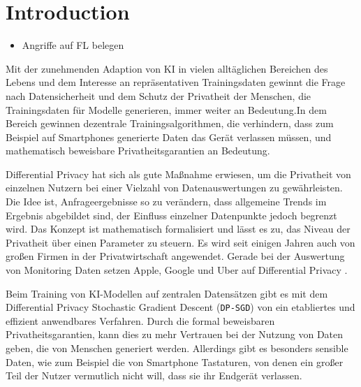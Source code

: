 \chapter{Introduction}
\begin{itemize}
	\item Angriffe auf FL belegen
\end{itemize}

Mit der zunehmenden Adaption von KI in vielen alltäglichen Bereichen des Lebens und dem Interesse an repräsentativen Trainingsdaten gewinnt die Frage nach Datensicherheit und dem Schutz der Privatheit der Menschen, die Trainingsdaten für Modelle generieren, immer weiter an Bedeutung.In dem Bereich gewinnen dezentrale Trainingsalgorithmen, die verhindern, dass zum Beispiel auf Smartphones generierte Daten das Gerät verlassen müssen, und mathematisch beweisbare Privatheitsgarantien an Bedeutung.

Differential Privacy hat sich als gute Maßnahme erwiesen, um die Privatheit von einzelnen Nutzern bei einer Vielzahl von Datenauswertungen zu gewährleisten. Die Idee ist, Anfrageergebnisse so zu verändern, dass allgemeine Trends im Ergebnis abgebildet sind, der Einfluss einzelner Datenpunkte jedoch begrenzt wird. Das Konzept ist mathematisch formalisiert und lässt es zu, das Niveau der Privatheit über einen Parameter zu steuern. Es wird seit einigen Jahren auch von großen Firmen in der Privatwirtschaft angewendet. Gerade bei der Auswertung von Monitoring Daten setzen Apple, Google und Uber auf Differential Privacy \parencite{apple:2017, erlingsson:2014, tezapsidis:2017}. 

Beim Training von KI-Modellen auf zentralen Datensätzen gibt es mit dem Differential Privacy Stochastic Gradient Descent (\texttt{DP-SGD}) von \textcite{abadi:2016} ein etabliertes und effizient anwendbares Verfahren. Durch die formal beweisbaren Privatheitsgarantien, kann dies zu mehr Vertrauen bei der Nutzung von Daten geben, die von Menschen generiert werden. Allerdings gibt es besonders sensible Daten, wie zum Beispiel die von Smartphone Tastaturen, von denen ein großer Teil der Nutzer vermutlich nicht will, dass sie ihr Endgerät verlassen.


